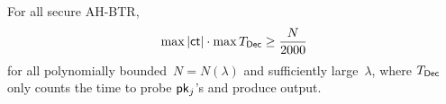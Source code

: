 \begin{corollary}\label{cor:lower-bound}
For all secure AH-BTR,
\begin{align*}
\max{|\ct|}\cdot\max{\TDec}\geq\frac{N}{2000}
\end{align*}
for all polynomially bounded~${N=N(\lambda)}$ and sufficiently large~$\lambda$,
where $\TDec$ only counts the time to probe $\pk_j$'s and produce output.
\end{corollary}
